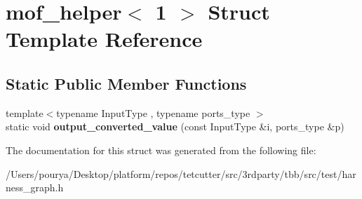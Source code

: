 \hypertarget{structmof__helper_3_011_01_4}{}\section{mof\+\_\+helper$<$ 1 $>$ Struct Template Reference}
\label{structmof__helper_3_011_01_4}
\subsection*{Static Public Member Functions}
\begin{DoxyCompactItemize}
\item 
\hypertarget{structmof__helper_3_011_01_4_a6859c8f1acec8f93c59da8f9e2bfbcb0}{}{\footnotesize template$<$typename Input\+Type , typename ports\+\_\+type $>$ }\\static void {\bfseries output\+\_\+converted\+\_\+value} (const Input\+Type \&i, ports\+\_\+type \&p)\label{structmof__helper_3_011_01_4_a6859c8f1acec8f93c59da8f9e2bfbcb0}

\end{DoxyCompactItemize}


The documentation for this struct was generated from the following file\+:\begin{DoxyCompactItemize}
\item 
/\+Users/pourya/\+Desktop/platform/repos/tetcutter/src/3rdparty/tbb/src/test/harness\+\_\+graph.\+h\end{DoxyCompactItemize}

